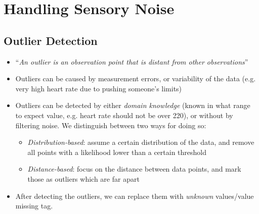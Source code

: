 \section{Handling Sensory Noise}
\label{sec:chapter_3_sensory_noise}
\subsection{Outlier Detection}
\begin{itemize}
	\item ``\textit{An outlier is an observation point that is distant from other observations}''
	\item Outliers can be caused by measurement errors, or variability of the data (e.g. very high heart rate due to pushing someone's limits)
	\item Outliers can be detected by either \textit{domain knowledge} (known in what range to expect value, e.g. heart rate should not be over 220), or without by filtering noise. We distinguish between two ways for doing so:
	\begin{itemize}
		\item \textit{Distribution-based}: assume a certain distribution of the data, and remove all points with a likelihood lower than a certain threshold
		\item \textit{Distance-based}: focus on the distance between data points, and mark those as outliers which are far apart
	\end{itemize}
	\item After detecting the outliers, we can replace them with \textit{unknown} values/value missing tag. 
\end{itemize}
